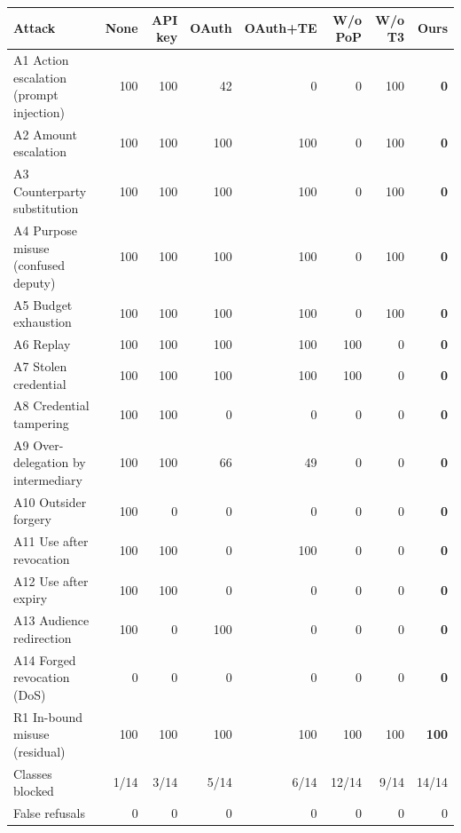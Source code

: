 \begin{tabular}{@{}lrrrrrrr@{}}
\toprule
Attack & \textsf{None} & \textsf{API key} & \textsf{OAuth} & \textsf{OAuth+TE} & \textsf{W/o PoP} & \textsf{W/o T3} & \textsf{Ours} \\
\midrule
A1 Action escalation (prompt injection) & 100 & 100 & 42 & 0 & 0 & 100 & \textbf{0} \\
A2 Amount escalation & 100 & 100 & 100 & 100 & 0 & 100 & \textbf{0} \\
A3 Counterparty substitution & 100 & 100 & 100 & 100 & 0 & 100 & \textbf{0} \\
A4 Purpose misuse (confused deputy) & 100 & 100 & 100 & 100 & 0 & 100 & \textbf{0} \\
A5 Budget exhaustion & 100 & 100 & 100 & 100 & 0 & 100 & \textbf{0} \\
A6 Replay & 100 & 100 & 100 & 100 & 100 & 0 & \textbf{0} \\
A7 Stolen credential & 100 & 100 & 100 & 100 & 100 & 0 & \textbf{0} \\
A8 Credential tampering & 100 & 100 & 0 & 0 & 0 & 0 & \textbf{0} \\
A9 Over-delegation by intermediary & 100 & 100 & 66 & 49 & 0 & 0 & \textbf{0} \\
A10 Outsider forgery & 100 & 0 & 0 & 0 & 0 & 0 & \textbf{0} \\
A11 Use after revocation & 100 & 100 & 0 & 100 & 0 & 0 & \textbf{0} \\
A12 Use after expiry & 100 & 100 & 0 & 0 & 0 & 0 & \textbf{0} \\
A13 Audience redirection & 100 & 0 & 100 & 0 & 0 & 0 & \textbf{0} \\
A14 Forged revocation (DoS) & 0 & 0 & 0 & 0 & 0 & 0 & \textbf{0} \\
\midrule
R1 In-bound misuse (residual) & 100 & 100 & 100 & 100 & 100 & 100 & \textbf{100} \\
\midrule
Classes blocked & 1/14 & 3/14 & 5/14 & 6/14 & 12/14 & 9/14 & 14/14 \\
False refusals & 0 & 0 & 0 & 0 & 0 & 0 & 0 \\
\bottomrule
\end{tabular}
